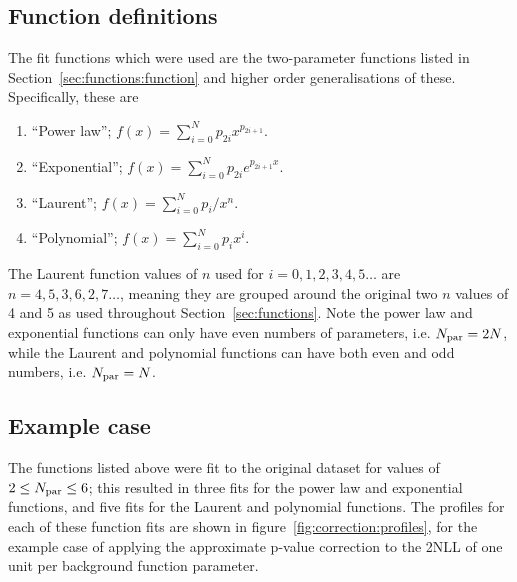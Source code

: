 \subsection{Function definitions}
\label{sec:correction:functions}
The fit functions which were used are the two-parameter functions listed in 
Section~\ref{sec:functions:function} and higher order generalisations of
these. Specifically, these are
\begin{enumerate}
\item
``Power law''; $f(x) = \sum_{i=0}^N p_{2i} x^{p_{2i+1}}$.
\item
``Exponential''; $f(x) = \sum_{i=0}^N p_{2i} e^{p_{2i+1}x}$.
\item
``Laurent''; $f(x) = \sum_{i=0}^N p_i/x^n$.
\item
``Polynomial''; $f(x) = \sum_{i=0}^N p_i x^i$.
\end{enumerate}
The Laurent function values of $n$ used for $i=0,1,2,3,4,5\dots$ are
$n=4,5,3,6,2,7\dots$, meaning they are grouped around the original
two $n$ values of 4 and 5 as used throughout Section~\ref{sec:functions}.
Note the power law and exponential functions can only have even numbers of
parameters, i.e. $N_{\rm par}=2N$, while the Laurent and polynomial functions
can have both even and odd numbers, i.e. $N_{\rm par}=N$.


\subsection{Example case}
\label{sec:correction:example}

The functions listed above were fit to the original dataset for values of 
$2 \le N_{\rm par} \le 6$; this resulted in three fits for the power law and
exponential functions, and five fits for the Laurent and polynomial functions.
The profiles for each of these function fits are shown in
figure~\ref{fig:correction:profiles}, for the example case of 
applying the approximate p-value correction to the 2NLL of one unit per 
background function parameter.

